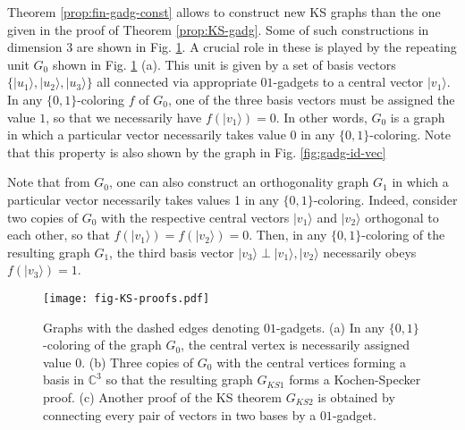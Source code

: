\documentclass[twocolumn, a4paper, superscriptaddress,nofootinbib, accepted=2020-08-07, hyperref]{quantumarticle}
\def\tred{\textcolor{red}}
\begin{document}
Theorem \ref{prop:fin-gadg-const} allows to construct new KS graphs than the one given in the proof of Theorem \ref{prop:KS-gadg}. Some of such constructions in dimension 3 are shown in Fig. \ref{fig:KS-proofs}. A crucial role in these is played by the repeating unit $G_0$ shown in Fig. \ref{fig:KS-proofs} (a). This unit is given by a set of basis vectors $\{|u_1 \rangle, |u_2 \rangle, |u_3 \rangle\}$ all connected via appropriate $01$-gadgets to a central vector $|v_1 \rangle$. In any $\{0,1\}$-coloring $f$ of $G_0$, one of the three basis vectors must be assigned the value $1$, so that we necessarily have $f(|v_1 \rangle) = 0$. In other words, $G_0$ is a graph in which a particular vector necessarily takes value $0$ in any $\{0,1\}$-coloring. Note that this property is also shown by the graph in Fig. \ref{fig:gadg-id-vec} 

Note that from $G_0$, one can also construct an orthogonality graph $G_1$ in which a particular vector necessarily takes values 1 in any $\{0,1\}$-coloring. Indeed, consider two copies of $G_0$ with the respective central vectors $|v_1 \rangle$ and $|v_2 \rangle$ orthogonal to each other, so that $f(|v_1 \rangle) = f(|v_2 \rangle) = 0$. Then, in any $\{0,1\}$-coloring of the resulting graph $G_1$, the third basis vector $|v_3 \rangle \perp |v_1 \rangle, |v_2 \rangle$ necessarily obeys $f(|v_3 \rangle) = 1$.  

\begin{figure}
	\centerline{\texttt{[image: fig-KS-proofs.pdf]}}
	\caption{Graphs with the dashed edges denoting $01$-gadgets. (a) In any $\{0,1\}$-coloring of the graph $G_0$, the central vertex is necessarily assigned value $0$. (b) Three copies of $G_0$ with the central vertices forming a basis in $\mathbb{C}^3$ so that the resulting graph $G_{KS1}$ forms a Kochen-Specker proof. (c) Another proof of the KS theorem $G_{KS2}$ is obtained by connecting every pair of vectors in two bases by a $01$-gadget.}
	\label{fig:KS-proofs}
\end{figure} 
\end{document}
